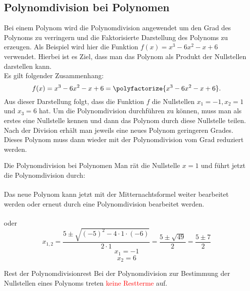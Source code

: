 \subsection{Polynomdivision bei Polynomen}\label{polynomdivision}
    Bei einem Polynom wird die Polynomdivision angewendet um den Grad des Polynoms zu verringern und die Faktorisierte Darstellung des Polynoms zu erzeugen. Als Beispiel wird hier die Funktion $f(x) = x^3-6x^2-x+6$ verwendet. Hierbei ist es Ziel, dass man das Polynom als Produkt der Nullstellen darstellen kann.\\
    Es gilt folgender Zusammenhang: $$f(x) = x^3-6x^2-x+6 =  \polyfactorize{x^3-6x^2-x+6}.$$ Aus dieser Darstellung folgt, dass die Funktion $f$ die Nullstellen $x_1 = -1, x_2 = 1$ und $x_3= 6$ hat. Um die Polynomdivision durchführen zu können, muss man als erstes eine Nullstelle kennen und dann das Polynom durch diese Nullstelle teilen. Nach der Division erhält man jeweils eine neues Polynom geringeren Grades. Dieses Polynom muss dann wieder mit der Polynomdivision vom Grad reduziert werden.
    \begin{bsp}{Die Polynomdivision bei Polynomen}{} 
Man rät die Nullstelle $x=1$ und führt jetzt die Polynomdivision durch:\\
 \\
 Das neue Polynom kann jetzt mit der Mitternachtsformel weiter bearbeitet werden oder erneut durch eine Polynomdivision bearbeitet werden. \\
  \\
  oder
  $$ x_{1,2} = \dfrac{5\pm \sqrt{(-5)^2 - 4\cdot 1 \cdot (-6)}}{2\cdot 1} = \dfrac{5 \pm \sqrt{49} }{2} = \dfrac{5\pm 7}{2}$$
 $$ x_1 = -1$$
 $$ x_2= 6$$
\begin{center}
\end{center}
\end{bsp}
\begin{b8d}{Rest der Polynomdivision}{rest}
  Bei der Polynomdivision zur Bestimmung der Nullstellen eines Polynoms treten \textcolor{red}{keine Restterme} auf.   
\end{b8d}
